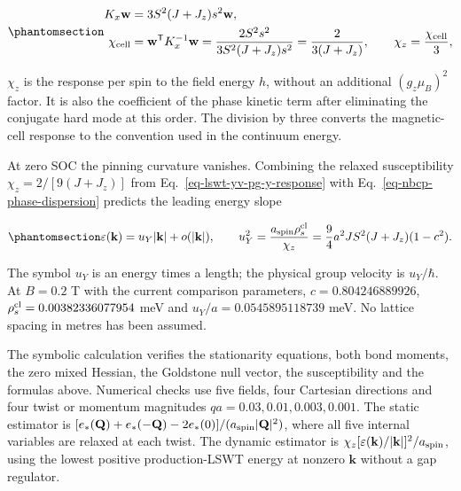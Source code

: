 \begin{equation}\phantomsection\label{eq-nbcp-y-hessian-response}{
\begin{aligned}
K_x\mathbf w&=3S^2(J+J_z)s^2\mathbf w,\\
\chi_{\rm cell}&=\mathbf w^{\mathsf T}K_x^{-1}\mathbf w
=\frac{2S^2s^2}{3S^2(J+J_z)s^2}
=\frac{2}{3(J+J_z)},\qquad
\chi_z=\frac{\chi_{\rm cell}}{3},
\end{aligned}
}\end{equation}

\(\chi_z\) is the response per spin to the field energy \(h\), without
an additional \((g_z\mu_B)^2\) factor. It is also the coefficient of the
phase kinetic term after eliminating the conjugate hard mode at this
order. The division by three converts the magnetic-cell response to the
convention used in the continuum energy.

At zero SOC the pinning curvature vanishes. Combining the relaxed
susceptibility \(\chi_z=2/[9(J+J_z)]\) from
Eq.~\ref{eq-lswt-yv-pg-y-response} with
Eq.~\ref{eq-nbcp-phase-dispersion} predicts the leading energy slope

\begin{equation}\phantomsection\label{eq-nbcp-y-stiffness-dispersion}{
\varepsilon(\mathbf k)=u_Y|\mathbf k|+o(|\mathbf k|),
\qquad
u_Y^2=\frac{a_{\rm spin}\rho_s^{\rm cl}}{\chi_z}
=\frac94 a^2JS^2(J+J_z)(1-c^2).
}\end{equation}

The symbol \(u_Y\) is an energy times a length; the physical group
velocity is \(u_Y/\hbar\). At \(B=0.2\) T with the current comparison
parameters, \(c=0.804246889926\), \(\rho_s^{\rm cl}=0.00382336077954\)
meV and \(u_Y/a=0.0545895118739\) meV. No lattice spacing in metres has
been assumed.

The symbolic calculation verifies the stationarity equations, both bond
moments, the zero mixed Hessian, the Goldstone null vector, the
susceptibility and the formulas above. Numerical checks use five fields,
four Cartesian directions and four twist or momentum magnitudes
\(qa=0.03,0.01,0.003,0.001\). The static estimator is
\([e_*(\mathbf Q)+e_*(-\mathbf Q)-2e_*(0)]/(a_{\rm spin}|\mathbf Q|^2)\),
where all five internal variables are relaxed at each twist. The dynamic
estimator is
\(\chi_z[\varepsilon(\mathbf k)/|\mathbf k|]^2/a_{\rm spin}\), using the
lowest positive production-LSWT energy at nonzero \(\mathbf k\) without
a gap regulator.

